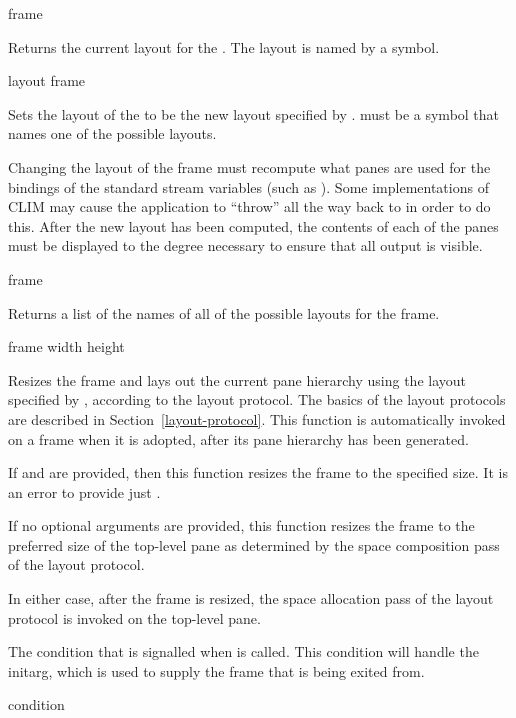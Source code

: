  {frame}

Returns the current layout for the  .  The layout is
named by a symbol.

 {layout frame}

Sets the layout of the   to be the new layout specified
by .   must be a symbol that names one of the
possible layouts.

Changing the layout of the frame must recompute what panes are used for the
bindings of the standard stream variables (such as ).  Some
implementations of CLIM may cause the application to ``throw'' all the way back
to  in order to do this.  After the new layout has been
computed, the contents of each of the panes must be displayed to the degree
necessary to ensure that all output is visible.

 {frame}

Returns a list of the names of all of the possible layouts for the frame.

 {frame \optional width height}

Resizes the frame and lays out the current pane hierarchy using the layout
specified by , according to the layout protocol.  The
basics of the layout protocols are described in Section~\ref{layout-protocol}.
This function is automatically invoked on a frame when it is adopted, after its
pane hierarchy has been generated.

If  and  are provided, then this function resizes the
frame to the specified size.  It is an error to provide just .

If no optional arguments are provided, this function resizes the frame to the
preferred size of the top-level pane as determined by the space composition pass
of the layout protocol.

In either case, after the frame is resized, the space allocation pass of the
layout protocol is invoked on the top-level pane.



The condition that is signalled when  is called.  This condition
will handle the  initarg, which is used to supply the frame that is
being exited from.

 {condition}

